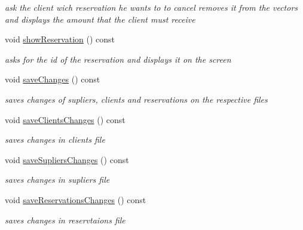 \begin{DoxyCompactItemize}
\begin{DoxyCompactList}\small\item\em ask the client wich reservation he wants to to cancel removes it from the vectors and displays the amount that the client must receive \end{DoxyCompactList}\item 
\hypertarget{class_company_aec3da42cd9c40660c9b6478dfb246109}{}\label{class_company_aec3da42cd9c40660c9b6478dfb246109} 
void \hyperlink{class_company_aec3da42cd9c40660c9b6478dfb246109}{show\+Reservation} () const
\begin{DoxyCompactList}\small\item\em asks for the id of the reservation and displays it on the screen \end{DoxyCompactList}\item 
\hypertarget{class_company_a72134cd31bcd5a1bac08ad8e6235d28f}{}\label{class_company_a72134cd31bcd5a1bac08ad8e6235d28f} 
void \hyperlink{class_company_a72134cd31bcd5a1bac08ad8e6235d28f}{save\+Changes} () const
\begin{DoxyCompactList}\small\item\em saves changes of supliers, clients and reservations on the respective files \end{DoxyCompactList}\item 
\hypertarget{class_company_ae5cc3089ac58af98b1f4a0b3a7d7e7af}{}\label{class_company_ae5cc3089ac58af98b1f4a0b3a7d7e7af} 
void \hyperlink{class_company_ae5cc3089ac58af98b1f4a0b3a7d7e7af}{save\+Clients\+Changes} () const
\begin{DoxyCompactList}\small\item\em saves changes in clients file \end{DoxyCompactList}\item 
\hypertarget{class_company_a0c8230826db8ef8884e06e0fba61800e}{}\label{class_company_a0c8230826db8ef8884e06e0fba61800e} 
void \hyperlink{class_company_a0c8230826db8ef8884e06e0fba61800e}{save\+Supliers\+Changes} () const
\begin{DoxyCompactList}\small\item\em saves changes in supliers file \end{DoxyCompactList}\item 
\hypertarget{class_company_ad9a63c107f1d1c763577961e42aae6c8}{}\label{class_company_ad9a63c107f1d1c763577961e42aae6c8} 
void \hyperlink{class_company_ad9a63c107f1d1c763577961e42aae6c8}{save\+Reservations\+Changes} () const
\begin{DoxyCompactList}\small\item\em saves changes in reservtaions file \end{DoxyCompactList}\end{DoxyCompactItemize}


